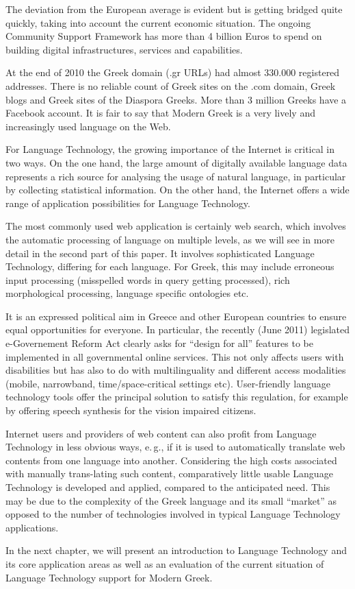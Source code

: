 \begin{multicols}{2}
The deviation from the European average is evident but is getting bridged quite quickly, taking into account the current economic situation. The ongoing Community Support Framework has more than 4 billion Euros to spend on building digital infrastructures, services and capabilities.

At the end of 2010 the Greek domain (.gr URLs) had almost 330.000 registered addresses. There is no reliable count of Greek sites on the .com domain, Greek blogs and Greek sites of the Diaspora Greeks. More than 3 million Greeks have a Facebook account. It is fair to say that Modern Greek is a very lively and increasingly used language on the Web.

For Language Technology, the growing importance of the Internet is critical in two ways. On the one hand, the large amount of digitally available language data represents a rich source for analysing the usage of natural language, in particular by collecting statistical information. On the other hand, the Internet offers a wide range of application possibilities for Language Technology.

The most commonly used web application is certainly web search, which involves the automatic processing of language on multiple levels, as we will see in more detail in the second part of this paper. It involves sophisticated Language Technology, differing for each language. For Greek, this may include erroneous input processing (misspelled words in query getting processed), rich morphological processing, language specific ontologies etc.

It is an expressed political aim in Greece and other European countries to ensure equal opportunities for everyone. In particular, the recently (June 2011) legislated e-Governement Reform Act clearly asks for “design for all” features to be implemented in all governmental online services. This not only affects users with disabilities but has also to do with multilinguality and different access modalities (mobile, narrowband, time/space-critical settings etc). User-friendly language technology tools offer the principal solution to satisfy this regulation, for example by offering speech synthesis for the vision impaired citizens.

Internet users and providers of web content can also profit from Language Technology in less obvious ways, e.\,g., if it is used to automatically translate web contents from one language into another. Considering the high costs associated with manually trans-lating such content, comparatively little usable Language Technology is developed and applied, compared to the anticipated need. This may be due to the complexity of the Greek language and its small “market” as opposed to the number of technologies involved in typical Language Technology applications. 

In the next chapter, we will present an introduction to Language Technology and its core application areas as well as an evaluation of the current situation of Language Technology support for Modern Greek.
\end{multicols}

